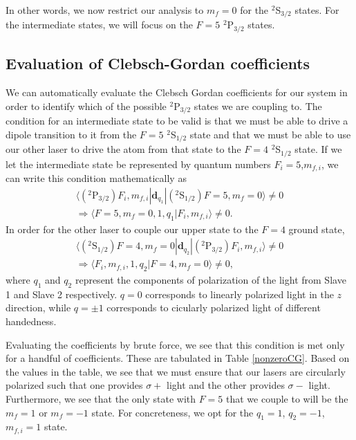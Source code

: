 In other words, we now restrict our analysis to $m_f=0$ for the $^2$S$_{3/2}$ states. For the intermediate states, we will focus on the $F=5$ $^2$P$_{3/2}$ states. 

\subsection{Evaluation of Clebsch-Gordan coefficients}

We can automatically evaluate the Clebsch Gordan coefficients for our system in order to identify which of the possible $^2$P$_{3/2}$ states we are coupling to. The condition for an intermediate state to be valid is that we must be able to drive a dipole transition to it from the $F=5$ $^2$S$_{1/2}$ state and that we must be able to use our other laser to drive the atom from that state to the $F=4$ $^2$S$_{1/2}$ state. If we let the intermediate state be represented by quantum numbers $F_i=5$,$m_{f,i}$, we can write this condition mathematically as  
\begin{multline}
\langle (^2\mathrm{P}_{3/2}) F_i,m_{f,i}|\mathbf{d}_{q_1}|(^2\mathrm{S}_{1/2})F=5,m_f=0\rangle\neq 0 \\
\Rightarrow \langle F=5,m_f=0,1,q_1|F_i,m_{f,i}\rangle \neq 0  \label{thing1}.
\end{multline}
In order for the other laser to couple our upper state to the $F=4$ ground state, 
\begin{multline}
\langle (^2\mathrm{S}_{1/2})F=4,m_f=0|\mathbf{d}_{q_2}|(^2\mathrm{P}_{3/2}) F_i,m_{f,i}\rangle\neq 0 \\
\Rightarrow
\langle F_i,m_{f,i},1,q_2|F=4,m_f=0 \rangle \neq 0 \label{thing2},
\end{multline}
where $q_1$ and $q_2$ represent the components of polarization of the light from Slave 1 and Slave 2 respectively. $q=0$ corresponds to linearly polarized light in the $z$ direction, while $q=\pm 1$ corresponds to cicularly polarized light of different handedness.

Evaluating the coefficients by brute force, we see that this condition is met only for a handful of coefficients. These are tabulated in Table \ref{nonzeroCG}. Based on the values in the table, we see that we must ensure that our lasers are circularly polarized such that one provides $\sigma+$ light and the other provides $\sigma-$ light. Furthermore, we see that the only state with $F=5$ that we couple to will be the $m_f=1$ or $m_f=-1$ state. For concreteness, we opt for the $q_1=1$, $q_2=-1$,$m_{f,i}=1$ state. 

